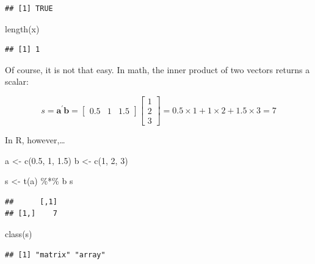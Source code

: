 \documentclass[
  11pt,
]{article}
\newenvironment{Shaded}{\begin{snugshade}}{\end{snugshade}}
\newcommand{\DecValTok}[1]{\textcolor[rgb]{0.00,0.00,0.81}{#1}}
\newcommand{\FloatTok}[1]{\textcolor[rgb]{0.00,0.00,0.81}{#1}}
\newcommand{\FunctionTok}[1]{\textcolor[rgb]{0.00,0.00,0.00}{#1}}
\newcommand{\NormalTok}[1]{#1}
\newcommand{\OtherTok}[1]{\textcolor[rgb]{0.56,0.35,0.01}{#1}}
\newcommand{\SpecialCharTok}[1]{\textcolor[rgb]{0.00,0.00,0.00}{#1}}
\begin{document}
\begin{verbatim}
## [1] TRUE
\end{verbatim}

\begin{Shaded}
\begin{Highlighting}[]
\FunctionTok{length}\NormalTok{(x)}
\end{Highlighting}
\end{Shaded}

\begin{verbatim}
## [1] 1
\end{verbatim}

Of course, it is not that easy. In math, the inner product of two vectors returns a scalar:

\[s = \mathbf{a}^{\prime} \mathbf{b} = \begin{bmatrix} 0.5 & 1 & 1.5\end{bmatrix} \begin{bmatrix} 1 \\ 2 \\ 3 \end{bmatrix} = 0.5 \times 1 + 1 \times 2 + 1.5 \times 3 = 7\]

In R, however,\ldots{}

\begin{Shaded}
\begin{Highlighting}[]
\NormalTok{a }\OtherTok{\textless{}{-}} \FunctionTok{c}\NormalTok{(}\FloatTok{0.5}\NormalTok{, }\DecValTok{1}\NormalTok{, }\FloatTok{1.5}\NormalTok{)}
\NormalTok{b }\OtherTok{\textless{}{-}} \FunctionTok{c}\NormalTok{(}\DecValTok{1}\NormalTok{, }\DecValTok{2}\NormalTok{, }\DecValTok{3}\NormalTok{)}

\NormalTok{s }\OtherTok{\textless{}{-}} \FunctionTok{t}\NormalTok{(a) }\SpecialCharTok{\%*\%}\NormalTok{ b}
\NormalTok{s}
\end{Highlighting}
\end{Shaded}

\begin{verbatim}
##      [,1]
## [1,]    7
\end{verbatim}

\begin{Shaded}
\begin{Highlighting}[]
\FunctionTok{class}\NormalTok{(s)}
\end{Highlighting}
\end{Shaded}

\begin{verbatim}
## [1] "matrix" "array"
\end{verbatim}
\end{document}
